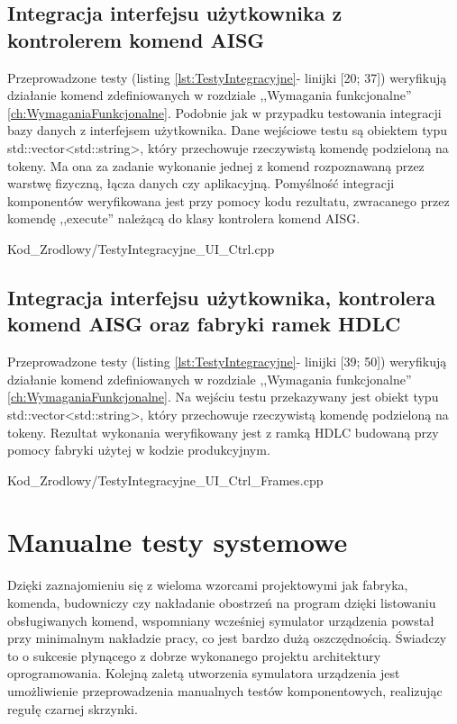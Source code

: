     \subsection{Integracja interfejsu użytkownika z kontrolerem komend AISG}
    Przeprowadzone testy (listing \ref{lst:TestyIntegracyjne}- linijki [20; 37]) weryfikują działanie komend zdefiniowanych w rozdziale ,,Wymagania funkcjonalne''
    \ref{ch:WymaganiaFunkcjonalne}.
    Podobnie jak w przypadku testowania integracji bazy danych z interfejsem użytkownika. Dane wejściowe testu są obiektem typu std::vector<std::string>, który przechowuje
    rzeczywistą komendę podzieloną na tokeny. Ma ona za zadanie wykonanie jednej z komend rozpoznawaną przez warstwę fizyczną, łącza danych czy aplikacyjną.
    Pomyślność integracji komponentów weryfikowana jest przy pomocy kodu rezultatu, zwracanego przez komendę ,,execute'' należącą do klasy kontrolera komend AISG.
    
        {Kod_Zrodlowy/TestyIntegracyjne_UI_Ctrl.cpp}
\newpage

    \subsection{Integracja interfejsu użytkownika, kontrolera komend AISG oraz fabryki ramek HDLC}
    Przeprowadzone testy (listing \ref{lst:TestyIntegracyjne}- linijki [39; 50]) weryfikują działanie komend zdefiniowanych w rozdziale ,,Wymagania funkcjonalne''
    \ref{ch:WymaganiaFunkcjonalne}.
    Na wejściu testu przekazywany jest obiekt typu std::vector<std::string>, który przechowuje rzeczywistą komendę podzieloną na tokeny. Rezultat wykonania
    weryfikowany jest z ramką HDLC budowaną przy pomocy fabryki użytej w kodzie produkcyjnym.
    
        {Kod_Zrodlowy/TestyIntegracyjne_UI_Ctrl_Frames.cpp}
\section{Manualne testy systemowe}
Dzięki zaznajomieniu się z wieloma wzorcami projektowymi jak fabryka, komenda, 
budowniczy czy nakładanie obostrzeń na program dzięki listowaniu obsługiwanych komend, wspomniany wcześniej symulator urządzenia powstał
przy minimalnym nakładzie pracy, co jest bardzo dużą oszczędnością. Świadczy to o sukcesie płynącego z 
dobrze wykonanego projektu architektury oprogramowania. Kolejną zaletą utworzenia symulatora urządzenia jest umożliwienie przeprowadzenia manualnych testów komponentowych, 
realizując regułę czarnej skrzynki. 

